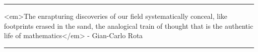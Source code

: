 \par\noindent\rule{\textwidth}{0.4pt}
<em>The enrapturing discoveries of our field systematically conceal,
like footprints erased in the sand, the analogical train of thought
that is the authentic life of mathematics</em> - Gian-Carlo Rota
\par\noindent\rule{\textwidth}{0.4pt}

